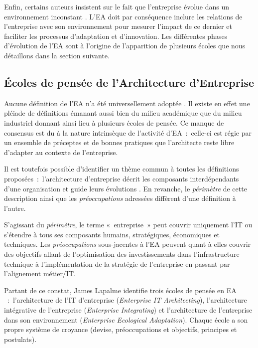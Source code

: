 Enfin, certains auteurs insistent sur le fait que l'entreprise évolue dans un 
environnement 
inconstant \cite{lapalme2012three}. L'EA doit par conséquence inclure les 
relations de l'entreprise avec son environnement pour mesurer l'impact de ce 
dernier et 
faciliter les processus d'adaptation et d'innovation. Les différentes phases 
d'évolution de l'EA sont à l'origine de l'apparition de plusieurs écoles que 
nous détaillons dans la section suivante.


	\subsection{Écoles de pensée de l'Architecture d'Entreprise} 
	\label{Lapalme}

Aucune définition de l'EA n'a été universellement adoptée 
\cite{mentz2012comparison} \cite{ranganathan2005enterprise}. Il existe en effet 
une pléiade de définitions émanant aussi bien du milieu académique que du milieu 
industriel donnant ainsi lieu à plusieurs écoles de pensée. Ce manque de 
consensus est du à la nature intrinsèque de l'activité d'EA~:~celle-ci est régie 
par un ensemble de préceptes et de bonnes pratiques que l'architecte reste libre 
d'adapter au contexte de l'entreprise. 

Il est toutefois possible d'identifier un thème commun à toutes les définitions 
proposées~:~l'architecture d'entreprise décrit les composants interdépendants 
d'une organisation et guide leurs évolutions \cite{lapalme2012three}. En 
revanche, le \textit{périmètre} de cette description ainsi que les 
\textit{préoccupations} adressées diffèrent d'une définition à l'autre.

S'agissant du \textit{périmètre}, le terme «~entreprise~» peut couvrir 
uniquement l'IT ou s'étendre à tous ses composants humains, stratégiques, 
économiques et techniques. Les \textit{préoccupations} sous-jacentes à l'EA 
peuvent quant à elles couvrir des objectifs allant de l'optimisation des 
investissements dans l'infrastructure technique à l'implémentation de la 
stratégie de l'entreprise en passant par l'alignement métier/IT. 

Partant de ce constat, James Lapalme identifie trois écoles de pensée en EA 
\cite{lapalme2012three}~:~l'architecture de l'IT d'entreprise 
(\textit{Enterprise IT Architecting}), l'architecture intégrative de 
l'entreprise 
(\textit{Enterprise Integrating}) et l'architecture de l'entreprise dans son 
environnement (\textit{Enterprise Ecological Adaptation}). Chaque école a son 
propre système de croyance (devise, préoccupations et objectifs, principes et 
postulats).


